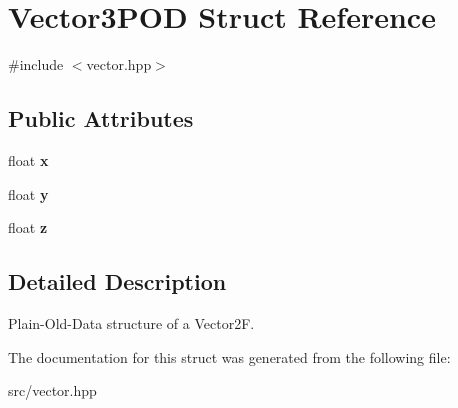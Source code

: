 \hypertarget{struct_vector3_p_o_d}{}\section{Vector3\+P\+OD Struct Reference}
\label{struct_vector3_p_o_d}


{\ttfamily \#include $<$vector.\+hpp$>$}

\subsection*{Public Attributes}
\begin{DoxyCompactItemize}
\item 
\mbox{\label{struct_vector3_p_o_d_a20697d084c23e3126914c6a10c300073}} 
float {\bfseries x}
\item 
\mbox{\label{struct_vector3_p_o_d_a00596acd41b53ab2b5a2667239d81083}} 
float {\bfseries y}
\item 
\mbox{\label{struct_vector3_p_o_d_a7fd1670144f56971ad09dc1887fb741b}} 
float {\bfseries z}
\end{DoxyCompactItemize}


\subsection{Detailed Description}
Plain-\/\+Old-\/\+Data structure of a Vector2F. 

The documentation for this struct was generated from the following file\+:\begin{DoxyCompactItemize}
\item 
src/vector.\+hpp\end{DoxyCompactItemize}
